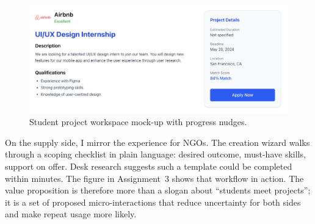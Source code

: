 \begin{figure}[H]
  \centering
  \includegraphics[width=0.85\linewidth]{figures/Student-Project-View.png}
  \caption{Student project workspace mock-up with progress nudges.}
  \label{fig:student-view}
\end{figure}

On the supply side, I mirror the experience for NGOs. The creation wizard walks through a scoping checklist in plain language: desired outcome, must-have skills, support on offer. Desk research suggests such a template could be completed within minutes. The figure in Assignment~3 shows that workflow in action. The value proposition is therefore more than a slogan about ``students meet projects''; it is a set of proposed micro-interactions that reduce uncertainty for both sides and make repeat usage more likely.
